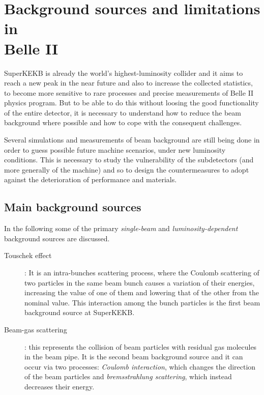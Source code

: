 \section{Background sources and limitations in \\Belle II}

SuperKEKB is already the world's highest-luminosity collider and it aims to reach a new peak in the near future and also to increase the collected statistics, to become more sensitive to rare processes and precise measurements of Belle II physics program. 
But to be able to do this without loosing the good functionality of the entire detector, it is necessary to understand how to reduce the beam background where possible and how to cope with the consequent challenges.

Several simulations and measurements of beam background are still being done in order to guess possible future machine scenarios, under new luminosity conditions.
This is necessary to study the vulnerability of the subdetectors (and more generally of the machine) and so to design the countermeasures to adopt against the deterioration of performance and materials.


\subsection{Main background sources}

In the following some of the primary \textit{single-beam} and \textit{luminosity-dependent} background sources are discussed.


\begin{description}
\item[Touschek effect]: 
	It is an intra-bunches scattering process, where the Coulomb scattering of two particles in the same beam bunch causes a variation of their energies, increasing the value of one of them and lowering that of the other from the nominal value. This interaction among the bunch particles is the first beam background source at SuperKEKB.
\item[Beam-gas scattering]: 
	this represents the collision of beam particles with residual gas molecules in the beam pipe. It is the second beam background source and it can occur via two processes: \emph{Coulomb interaction}, which changes the direction of the beam particles and \emph{bremsstrahlung scattering}, which instead decreases their energy. 
\end{description}
	
